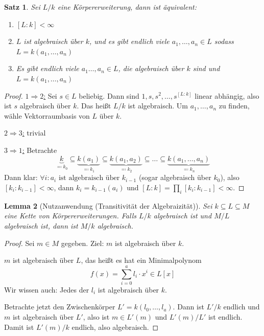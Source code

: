 \documentclass[a4paper,12pt,numbers=noenddot,parskip=full]{scrartcl}
\newcommand{\heading}{\underline}
\theoremstyle{dotless}
\newtheorem{theorem}{Satz}[section]
\newtheorem{lemma}[theorem]{Lemma}
\theoremstyle{remark}
\begin{document}
	\begin{theorem}
		\label{thm:1_27}
		Sei $L/k$ eine Körpererweiterung, dann ist äquivalent:
		\begin{enumerate}
			\item $[L:k] < \infty$
			\item $L$ ist algebraisch über $k$, und es gibt endlich viele $a_1, \dots, a_n \in L$ sodass $L = k(a_1, \dots, a_n)$
			\item Es gibt endlich viele $a_1 \dots, a_n \in L$, die algebraisch über $k$ sind und $L = k(a_1, \dots, a_n)$
		\end{enumerate}
	\end{theorem}

	\begin{proof}
		\heading{$1 \Rightarrow 2$:} Sei $s \in L$ beliebig. Dann sind $1,s,s^2, \dots, s^{[L:k]}$ linear abhängig, also ist $s$ algebraisch über $k$. Das heißt $L/k$ ist algebraisch.
		Um $a_1, \dots, a_n$ zu finden, wähle Vektorraumbasis von $L$ über $k$.
		
		\heading{$2 \Rightarrow 3$:} trivial
		
		\heading{$3 \Rightarrow 1$:} Betrachte
		\begin{equation*}
			\underbrace{k}_{\eqqcolon k_0} \subseteq \underbrace{k(a_1)}_{\eqqcolon k_1} \subseteq \underbrace{k(a_1, a_2)}_{\eqqcolon k_2} \subseteq \dots \subseteq \underbrace{k(a_1, \dots, a_n)}_{\eqqcolon k_n}
		\end{equation*}
		Dann klar: $\forall i: a_i \text{ ist algebraisch über } k_{i-1}$ (sogar algebraisch über $k_0$), also $[k_i: k_{i-1}] < \infty$, dann $k_i = k_{i-1}(a_i)$ und $[L:k] = \prod_i [k_i: k_{i-1}] < \infty$.
	\end{proof}

	\begin{lemma}[Nutzanwendung (Transitivität der Algebraizität)]
		Sei $k \subseteq L \subseteq M$ eine Kette von Körpererweiterungen. Falls $L/k$ algebraisch ist und $M/L$ algebraisch ist, dann ist $M/k$ algebraisch.
	\end{lemma}

	\begin{proof}
		Sei $m \in M$ gegeben. Ziel: $m$ ist algebraisch über $k$.
		
		$m$ ist algebraisch über $L$, das heißt es hat ein Minimalpolynom
		\begin{equation*}
			f(x) = \sum_{i=0}^a l_i \cdot x^i \in L[x]
		\end{equation*}
		Wir wissen auch: Jedes der $l_i$ ist algebraisch über $k$.
		
		Betrachte jetzt den Zwischenkörper $L' = k(l_0, \dots, l_a)$. Dann ist $L'/k$ endlich und $m$ ist algebraisch über $L'$, also ist $m \in L'(m)$ und $L'(m)/L'$ ist endlich. Damit ist $L'(m)/k$ endlich, also algebraisch.
	\end{proof}
\end{document}
